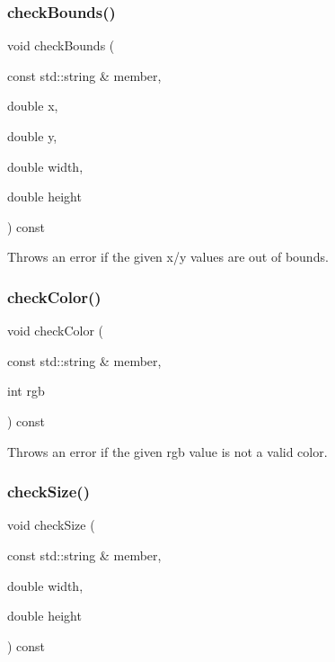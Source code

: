 \subsubsection{\texorpdfstring{check\+Bounds()}{checkBounds()}}
{\footnotesize\ttfamily void check\+Bounds (\begin{DoxyParamCaption}\item[{const std\+::string \&}]{member,  }\item[{double}]{x,  }\item[{double}]{y,  }\item[{double}]{width,  }\item[{double}]{height }\end{DoxyParamCaption}) const\hspace{0.3cm}{\ttfamily [protected]}}



Throws an error if the given x/y values are out of bounds. 

\mbox{\label{classsgl_1_1GDrawingSurface_a9841b5dc607ca41a14819d80e1d8a09c}} 
\subsubsection{\texorpdfstring{check\+Color()}{checkColor()}}
{\footnotesize\ttfamily void check\+Color (\begin{DoxyParamCaption}\item[{const std\+::string \&}]{member,  }\item[{int}]{rgb }\end{DoxyParamCaption}) const\hspace{0.3cm}{\ttfamily [protected]}}



Throws an error if the given rgb value is not a valid color. 

\mbox{\label{classsgl_1_1GDrawingSurface_a70a6546707ae708573396616bd0f5320}} 
\subsubsection{\texorpdfstring{check\+Size()}{checkSize()}}
{\footnotesize\ttfamily void check\+Size (\begin{DoxyParamCaption}\item[{const std\+::string \&}]{member,  }\item[{double}]{width,  }\item[{double}]{height }\end{DoxyParamCaption}) const\hspace{0.3cm}{\ttfamily [protected]}}



